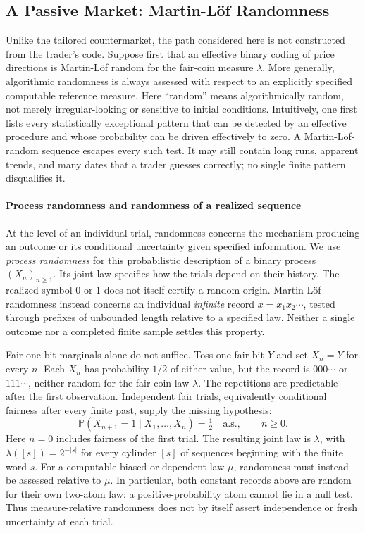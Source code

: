 \documentclass[aps,pra,reprint,superscriptaddress,amsmath,amssymb,floatfix]{revtex4-2}
\theoremstyle{plain}
\theoremstyle{definition}
\theoremstyle{remark}
\begin{document}
\subsection{A Passive Market: Martin-L\"of Randomness}

Unlike the tailored countermarket, the path considered here is not constructed
from the trader's code. Suppose first that an effective binary coding of price
directions is Martin-L\"of random for the fair-coin measure \(\lambda\). More
generally, algorithmic randomness is always assessed with respect to an
explicitly specified computable reference measure. Here ``random'' means
algorithmically random, not merely irregular-looking or sensitive to initial
conditions. Intuitively, one first lists every
statistically exceptional pattern that can be detected by an effective
procedure and whose probability can be driven effectively to zero. A
Martin-L\"of-random sequence escapes every such test. It may still contain long
runs, apparent trends, and many dates that a trader guesses correctly; no
single finite pattern disqualifies it.

\paragraph{Process randomness and randomness of a realized sequence}

At the level of an individual trial, randomness concerns the mechanism
producing an outcome or its conditional uncertainty given specified information.
We use \emph{process randomness} for this probabilistic description of a binary
process \((X_n)_{n\geq1}\). Its joint law specifies how the trials depend on
their history. The realized symbol \(0\) or \(1\) does not itself certify a
random origin. Martin-L\"of randomness instead concerns an individual
\emph{infinite} record \(x=x_1x_2\cdots\), tested through prefixes of
unbounded length relative to a specified law. Neither a single outcome nor a
completed finite sample settles this property.

Fair one-bit marginals alone do not suffice. Toss one fair bit \(Y\) and set
\(X_n=Y\) for every \(n\). Each \(X_n\) has probability \(1/2\) of either
value, but the record is \(000\cdots\) or \(111\cdots\), neither random for
the fair-coin law \(\lambda\). The repetitions are predictable after the first
observation. Independent fair trials, equivalently conditional fairness after
every finite past, supply the missing hypothesis:
\begin{equation}
  \mathbb P(X_{n+1}=1\mid X_1,\ldots,X_n)=\tfrac12
  \quad\text{a.s.},\qquad n\geq0.
  \label{eq:conditional-fairness}
\end{equation}
Here \(n=0\) includes fairness of the first trial. The resulting joint law is
\(\lambda\), with \(\lambda([s])=2^{-|s|}\) for every cylinder \([s]\) of
sequences beginning with the finite word \(s\). For a computable biased or
dependent law \(\mu\), randomness must instead be assessed relative to
\(\mu\). In particular, both constant records above are random for their own
two-atom law: a positive-probability atom cannot lie in a null test. Thus
measure-relative randomness does not by itself assert independence or fresh
uncertainty at each trial.
\end{document}
